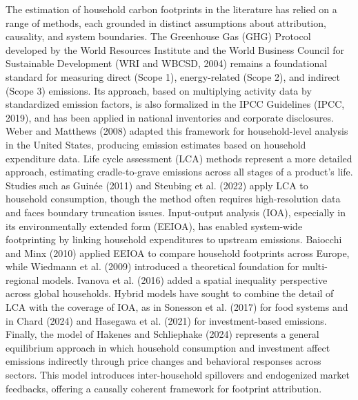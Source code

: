 \documentclass[12pt,a4paper]{article}%
\begin{document}
The estimation of household carbon footprints in the literature has relied on a range of methods, each grounded in distinct assumptions about attribution, causality, and system boundaries. The Greenhouse Gas (GHG) Protocol developed by the World Resources Institute and the World Business Council for Sustainable Development (WRI and WBCSD, 2004) remains a foundational standard for measuring direct (Scope 1), energy-related (Scope 2), and indirect (Scope 3) emissions. Its approach, based on multiplying activity data by standardized emission factors, is also formalized in the IPCC Guidelines (IPCC, 2019), and has been applied in national inventories and corporate disclosures. Weber and Matthews (2008) adapted this framework for household-level analysis in the United States, producing emission estimates based on household expenditure data. Life cycle assessment (LCA) methods represent a more detailed approach, estimating cradle-to-grave emissions across all stages of a product's life. Studies such as Guinée (2011) and Steubing et al. (2022) apply LCA to household consumption, though the method often requires high-resolution data and faces boundary truncation issues. Input-output analysis (IOA), especially in its environmentally extended form (EEIOA), has enabled system-wide footprinting by linking household expenditures to upstream emissions. Baiocchi and Minx (2010) applied EEIOA to compare household footprints across Europe, while Wiedmann et al. (2009) introduced a theoretical foundation for multi-regional models. Ivanova et al. (2016) added a spatial inequality perspective across global households. Hybrid models have sought to combine the detail of LCA with the coverage of IOA, as in Sonesson et al. (2017) for food systems and in Chard (2024) and Hasegawa et al. (2021) for investment-based emissions. Finally, the model of Hakenes and Schliephake (2024) represents a general equilibrium approach in which household consumption and investment affect emissions indirectly through price changes and behavioral responses across sectors. This model introduces inter-household spillovers and endogenized market feedbacks, offering a causally coherent framework for footprint attribution.
\end{document}
